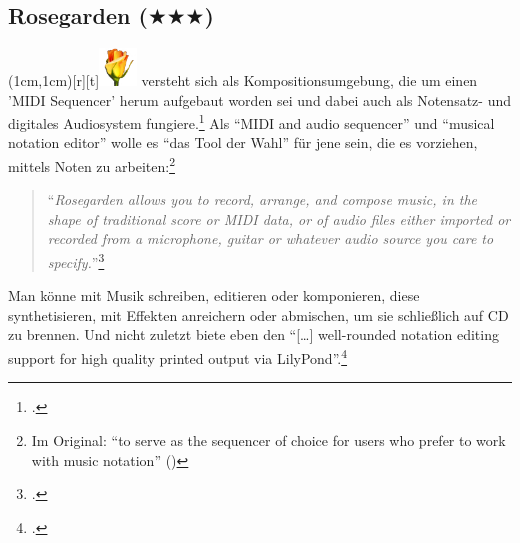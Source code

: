 %
%


\subsection{Rosegarden ($\bigstar\bigstar\bigstar$)}

\parpic(1cm,1cm)[r][t]{\includegraphics[width=1cm]{logos/rosegarden-300dpi.png}}
\label{Rosegarden} versteht sich als Kompositionsumgebung, die
um einen 'MIDI Sequencer' herum aufgebaut worden sei und dabei auch als
Notensatz- und digitales Audiosystem fungiere.\footcite[vgl.][\nopage
wp]{Rosegarden2019a} Als \enquote{MIDI and audio sequencer} und \enquote{musical
notation editor} wolle es \enquote{das Tool der Wahl} für jene sein, die es
vorziehen, mittels Noten zu arbeiten:\footnote{Im Original: \enquote{to serve as
the sequencer of choice for users who prefer to work with music notation}
(\cite[vgl.][\nopage wp]{Rosegarden2019c})}

\begin{quote}\enquote{\textit{Rosegarden allows you to record, arrange, and compose
music, in the shape of traditional score or MIDI data, or of audio files either
imported or recorded from a microphone, guitar or whatever audio source you care
to specify.}}\footcite[vgl.][\nopage wp]{Rosegarden2019c} \end{quote}

Man könne mit  Musik schreiben, editieren oder komponieren,
diese synthetisieren, mit Effekten anreichern oder abmischen, um sie schließlich
auf CD zu brennen. Und nicht zuletzt biete  eben den
\enquote{[\ldots] well-rounded notation editing support for high quality printed
output via LilyPond}.\footcite[vgl.][\nopage wp]{Rosegarden2019c}

